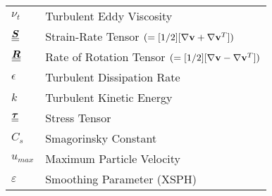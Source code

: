 \begin{longtable}{ll}
$\nu_t$                 & Turbulent Eddy Viscosity          \\
$\underline{\underline{\bm{S}}}$                   & Strain-Rate Tensor $(=[1/2][\nabla \mathbf{v} + \nabla \mathbf{v}^T])$                          \\
$\underline{\underline{\bm{R}}}$                   & Rate of Rotation Tensor $(=[1/2][\nabla \mathbf{v} - \nabla \mathbf{v}^T])$                     \\
$\epsilon$              & Turbulent Dissipation Rate        \\
$k$                     & Turbulent Kinetic Energy          \\
$\underline{\underline{\bm{\tau}}}$         & Stress Tensor                     \\
$C_s $                  & Smagorinsky Constant              \\
$u_{max}$               & Maximum Particle Velocity         \\
$\varepsilon$           & Smoothing Parameter (XSPH)       
\end{longtable}